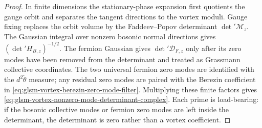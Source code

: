 \begin{proof}
In finite dimensions the stationary-phase expansion first quotients the gauge
orbit and separates the tangent directions to the vortex moduli.  Gauge
fixing replaces the orbit volume by the Faddeev--Popov determinant
\(\det{}'\mathcal M_z\).  The Gaussian integral over nonzero bosonic normal
directions gives \((\det{}'H_{B,z})^{-1/2}\).  The fermion Gaussian gives
\(\det{}'\mathcal D_{F,z}\) only after its zero modes have been removed from
the determinant and treated as Grassmann collective coordinates.  The two
universal fermion zero modes are identified with the
\(d^2\widetilde\theta\) measure; any residual zero modes are paired with the
Berezin coefficient in
\eqref{eq:glsm-vortex-berezin-zero-mode-filter}.  Multiplying these finite
factors gives
\eqref{eq:glsm-vortex-nonzero-mode-determinant-complex}.  Each prime is
load-bearing: if the bosonic collective modes or fermion zero modes are left
inside the determinant, the determinant is zero rather than a vortex
coefficient.
\end{proof}

